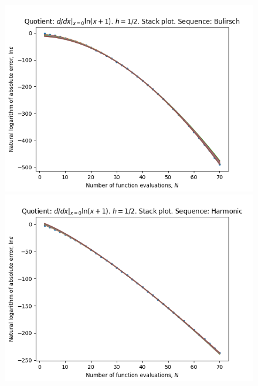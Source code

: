 \begin{figure}[H]
\centering
\begin{minipage}{0.45\textwidth}
\centering
\includegraphics[scale=0.45]{../results/diff_quot_plots/h_one_hp_bulirsch_stack.png}
\end{minipage}
\begin{minipage}{0.45\textwidth}
\centering
\includegraphics[scale=0.45]{../results/diff_quot_plots/h_one_hp_harmonic_stack.png}
\end{minipage}
\end{figure}

